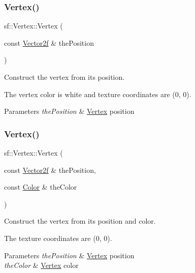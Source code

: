\subsubsection{\texorpdfstring{Vertex()}{Vertex()}\hspace{0.1cm}{\footnotesize\ttfamily [1/4]}}
{\footnotesize\ttfamily sf\+::\+Vertex\+::\+Vertex (\begin{DoxyParamCaption}\item[{const \hyperlink{classsf_1_1_vector2}{Vector2f} \&}]{the\+Position }\end{DoxyParamCaption})}



Construct the vertex from its position. 

The vertex color is white and texture coordinates are (0, 0).


\begin{DoxyParams}{Parameters}
{\em the\+Position} & \hyperlink{classsf_1_1_vertex}{Vertex} position \\
\hline
\end{DoxyParams}
\mbox{\label{classsf_1_1_vertex_a70b0679b4ec531d5bd1a7d0225c7321a}} 
\subsubsection{\texorpdfstring{Vertex()}{Vertex()}\hspace{0.1cm}{\footnotesize\ttfamily [2/4]}}
{\footnotesize\ttfamily sf\+::\+Vertex\+::\+Vertex (\begin{DoxyParamCaption}\item[{const \hyperlink{classsf_1_1_vector2}{Vector2f} \&}]{the\+Position,  }\item[{const \hyperlink{classsf_1_1_color}{Color} \&}]{the\+Color }\end{DoxyParamCaption})}



Construct the vertex from its position and color. 

The texture coordinates are (0, 0).


\begin{DoxyParams}{Parameters}
{\em the\+Position} & \hyperlink{classsf_1_1_vertex}{Vertex} position \\
\hline
{\em the\+Color} & \hyperlink{classsf_1_1_vertex}{Vertex} color \\
\hline
\end{DoxyParams}
\mbox{\label{classsf_1_1_vertex_ab9bf849c4c0d82d09bf5bece23d2456a}} 
